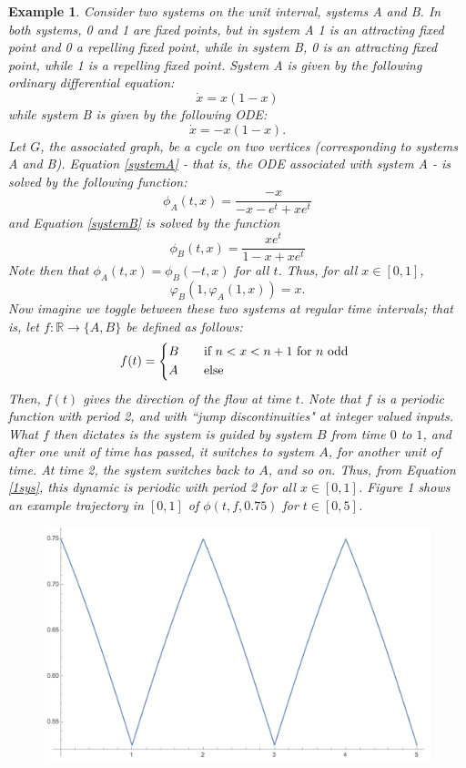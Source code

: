 \documentclass[11pt]{article}
\newtheorem{ex}[thm]{Example}
\begin{document}
\begin{ex}\label{example1}
Consider two systems on the unit interval, systems A and B.  In both systems, 0 and 1 are fixed points, but in system A 1 is an attracting fixed point and 0 a repelling fixed point, while in system B, 0 is an attracting fixed point, while 1 is a repelling fixed point.  System A is given by the following ordinary differential equation:
\begin{equation}\label{systemA}\dot{x}=x(1-x)\end{equation}
while system B is given by the following ODE:
\begin{equation}\label{systemB}\dot{x}=-x(1-x).\end{equation}
Let $G$, the associated graph, be a cycle on two vertices (corresponding to systems A and B).  Equation \ref{systemA} - that is, the ODE associated with system A - is solved by the following function:
$$\phi_A(t,x)=\frac{-x}{-x-e^t+xe^t}$$
and Equation \ref{systemB} is solved by the function
$$\phi_B(t,x)=\frac{xe^t}{1-x+xe^t}$$
Note then that $\phi_A(t,x)=\phi_B(-t,x)$ for all $t$.  Thus, for all $x\in[0,1]$, 
\begin{equation}\label{1sys}\varphi_B(1,\varphi_A(1,x))=x.\end{equation}
Now imagine we toggle between these two systems at regular time intervals; that is, let $f:\mathbb{R}\rightarrow\{A,B\}$ be defined as follows:
\[ f(t) =
  \begin{cases*}
    B \quad& if $ n<x<n+1$ for $n$ odd \\
    A & else \\
  \end{cases*}\]
Then, $f(t)$ gives the direction of the flow at time $t$.  Note that $f$ is a periodic function with period 2, and with ``jump discontinuities" at integer valued inputs.   What $f$ then dictates is the system is guided by system $B$ from time $0$ to $1$, and after one unit of time has passed, it switches to system $A$, for another unit of time.  At time 2, the system switches back to $A$, and so on. Thus, from Equation \ref{1sys}, this dynamic is periodic with period 2 for all $x\in[0,1]$.
Figure 1 shows an example trajectory in $[0,1]$ of $\phi(t,f,0.75)$ for $t\in[0,5]$.
\begin{figure}[!ht]\label{figure}
\begin{center}
\includegraphics[scale=0.45]{oscsys4}

\end{center}
\end{figure}
\end{ex}
\end{document}
